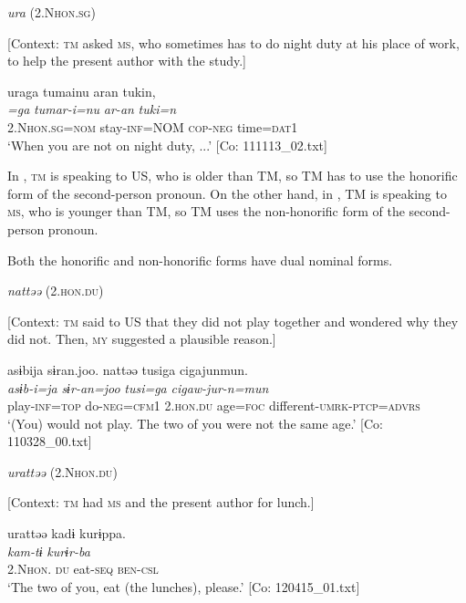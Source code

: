  \ex \label{ex:5:9b} \textit{ura} (2.N\textsc{hon}.\textsc{sg})

    [Context: \textsc{tm} asked \textsc{ms}, who sometimes has to do night duty at his place of work, to help the present author with the study.]

\glll  uraga  tumainu  aran  tukin,\\
\textit{=ga}  \textit{tumar-i=nu}  \textit{ar-an}  \textit{tuki=n}\\
2.N\textsc{hon}.\textsc{sg}=\textsc{nom}  stay-\textsc{inf}=NOM  \textsc{cop}-\textsc{neg}  time=\textsc{dat}1\\
\glt ‘When you are not on night duty, ...’ [Co: 111113\_02.txt]
\z
\z

\noindent In , \textsc{tm} is speaking to US, who is older than TM, so TM has to use the honorific form of the second-person pronoun. On the other hand, in , TM is speaking to \textsc{ms}, who is younger than TM, so TM uses the non-honorific form of the second-person pronoun.

  Both the honorific and non-honorific forms have dual nominal forms.

\ea \label{ex:5:10}  \ea \label{ex:5:10a} \textit{nattəə} (2.\textsc{hon}.\textsc{du})

    [Context: \textsc{tm} said to US that they did not play together and wondered why they did not. Then, \textsc{my} suggested a plausible reason.]

\glll  asɨbija  sɨran.joo.  nattəə  tusiga   cigajunmun.\\
\textit{asɨb-i=ja}  \textit{sɨr-an=joo}  \textit{}  \textit{tusi=ga}  \textit{cigaw-jur-n=mun}\\
play-\textsc{inf}=\textsc{top}  do-\textsc{neg}=\textsc{cfm}1  2.\textsc{hon}.\textsc{du}  age=\textsc{foc}  different-\textsc{umrk}-\textsc{ptcp}=\textsc{advrs}\\
\glt ‘(You) would not play. The two of you were not the same age.’ [Co: 110328\_00.txt]

 \ex \label{ex:5:b} \textit{urattəə} (2.N\textsc{hon}.\textsc{du})

    [Context: \textsc{tm} had \textsc{ms} and the present author for lunch.]

\glll  urattəə  kadɨ  kurɨppa.\\
\textit{}  \textit{kam-tɨ}  \textit{kurɨr-ba}\\
2.N\textsc{hon}. \textsc{du}  eat-\textsc{seq}  \textsc{ben}-\textsc{csl}\\
\glt ‘The two of you, eat (the lunches), please.’ [Co: 120415\_01.txt]
\z
\z

